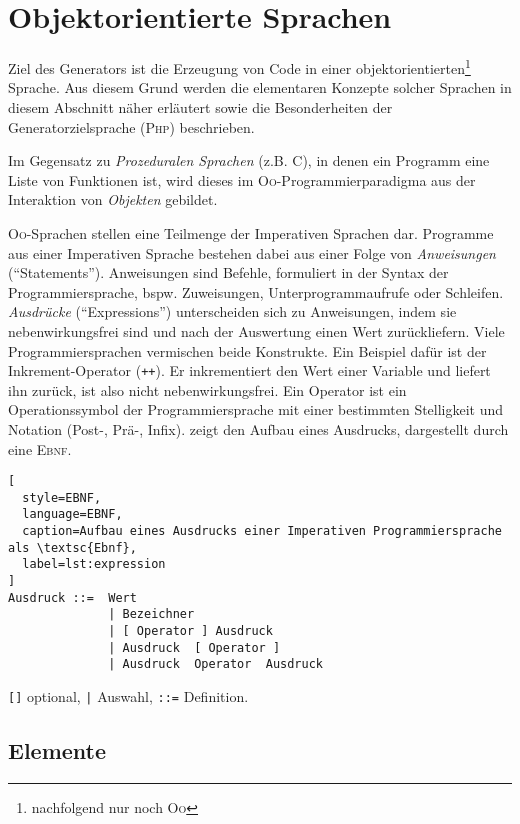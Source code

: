 \section{Objektorientierte Sprachen}
\label{sec:oo_languages}

Ziel des Generators ist die Erzeugung von Code in einer objektorientierten\footnote{nachfolgend nur noch \textsc{Oo}} Sprache. Aus diesem Grund werden die elementaren Konzepte solcher Sprachen in diesem Abschnitt näher erläutert sowie die Besonderheiten der Generatorzielsprache (\textsc{Php}) beschrieben.

Im Gegensatz zu \emph{Prozeduralen Sprachen} (z.B. C), in denen ein Programm eine Liste von Funktionen ist, wird dieses im \textsc{Oo}-Programmierparadigma aus der Interaktion von \emph{Objekten} gebildet. 

\textsc{Oo}-Sprachen stellen eine Teilmenge der Imperativen Sprachen dar. Programme aus einer Imperativen Sprache bestehen dabei aus einer Folge von \emph{Anweisungen} (\enquote{Statements}). Anweisungen sind Befehle, formuliert in der Syntax der Programmiersprache, bspw. Zuweisungen, Unterprogrammaufrufe oder Schleifen. \emph{Ausdrücke} (\enquote{Expressions}) unterscheiden sich zu Anweisungen, indem sie nebenwirkungsfrei sind und nach der Auswertung einen Wert zurückliefern. Viele Programmiersprachen vermischen beide Konstrukte. Ein Beispiel dafür ist der Inkrement-Operator (\texttt{++}). Er inkrementiert den Wert einer Variable und liefert ihn zurück, ist also nicht nebenwirkungsfrei.
Ein Operator ist ein Operationssymbol der Programmiersprache mit einer bestimmten Stelligkeit und Notation (Post-, Prä-, Infix).
 zeigt den Aufbau eines Ausdrucks, dargestellt durch eine \textsc{Ebnf}.

\begin{lstlisting}[
  style=EBNF, 
  language=EBNF,
  caption=Aufbau eines Ausdrucks einer Imperativen Programmiersprache als \textsc{Ebnf},
  label=lst:expression
]
Ausdruck ::=  Wert 
              | Bezeichner
              | [ Operator ] Ausdruck
              | Ausdruck  [ Operator ]
              | Ausdruck  Operator  Ausdruck
\end{lstlisting}
\vspace{-\baselineskip}
{\footnotesize \begin{center} \texttt{[]} optional, \texttt{|} Auswahl, \texttt{::=} Definition. \end{center}}

\subsection{Elemente}
\label{sec:elements_of_object_oriented_languages}

